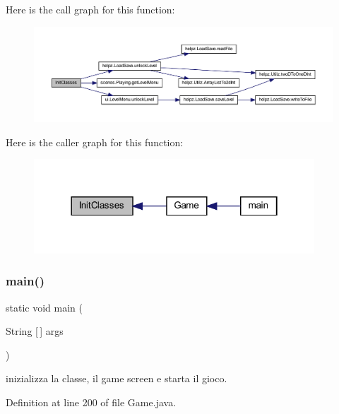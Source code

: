 Here is the call graph for this function\+:\nopagebreak
\begin{figure}[H]
\begin{center}
\leavevmode
\includegraphics[width=350pt]{classprogetto_1_1_game_a3e57c234c3dde4539f8b9c47d75e59ae_cgraph}
\end{center}
\end{figure}
Here is the caller graph for this function\+:\nopagebreak
\begin{figure}[H]
\begin{center}
\leavevmode
\includegraphics[width=298pt]{classprogetto_1_1_game_a3e57c234c3dde4539f8b9c47d75e59ae_icgraph}
\end{center}
\end{figure}
\mbox{\label{classprogetto_1_1_game_a8b260eecbaabcef8473fd87ada040682}} 
\subsubsection{\texorpdfstring{main()}{main()}}
{\footnotesize\ttfamily static void main (\begin{DoxyParamCaption}\item[{String \mbox{[}$\,$\mbox{]}}]{args }\end{DoxyParamCaption})\hspace{0.3cm}{\ttfamily [static]}}



inizializza la classe, il game screen e starta il gioco. 



Definition at line 200 of file Game.\+java.

